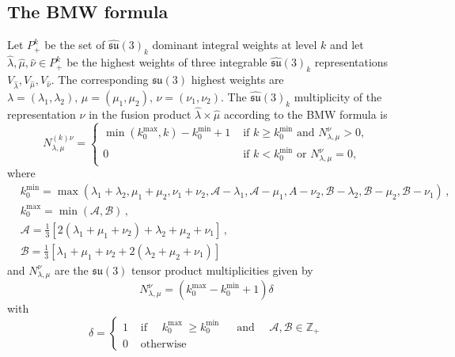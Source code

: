 \documentclass[a4paper,11pt]{article}
\theoremstyle{plain}
\theoremstyle{definition}
\newcommand{\aff}{\widehat{\mathfrak{su}}(3)_k}
\begin{document}
\subsection{The BMW formula }



Let $P^k_+$ be the set of $\aff$ dominant integral weights at level $k$ and let $\hat{\lambda},\hat{\mu},\hat{\nu}\in P^k_+$ be the highest weights  of three integrable $\widehat{\mathfrak{su}}(3)_k$ representations $V_{\hat{\lambda}},V_{\hat{\mu}},V_{\hat{\nu}}$. The corresponding  $\mathfrak{su}(3)$ highest weights are $\lambda=(\lambda_1,\lambda_2),\,\mu=(\mu_1,\mu_2),\,\nu=(\nu_1,\nu_2)$. The  $\aff$ multiplicity of the representation $\hat{\nu}$ in the fusion product $\hat{\lambda} \times \hat{\mu}$ according to the BMW formula  \cite{BMW}
is
\begin{equation}
   N_{\lambda, \mu}^{(k) \nu}= \begin{cases}\min \left(k_0^{\max }, k\right)-k_0^{\min }+1 & \text { if } k \geq k_0^{\min } \text { and } N_{\lambda, \mu}^\nu>0, \\ 0 & \text { if } k<k_0^{\min } \text { or } N_{\lambda, \mu}^\nu=0,\end{cases}
\end{equation}
where
\begin{align} \label{BMWkk}
& k_0^{\min }=\max \left(\lambda_1+\lambda_2, \mu_1+\mu_2, \nu_1+\nu_2,\mathcal{A}-\lambda_1,\mathcal{A}-\mu_1,A-\nu_2,\mathcal{B}-\lambda_2,\mathcal{B}-\mu_2,\mathcal{B}-\nu_1\right)\, ,  \nonumber \\
& k_0^{\max }=\min (\mathcal{A}, \mathcal{B}) \, , \nonumber \\
& \mathcal{A}=\frac{1}{3}\left[2\left(\lambda_1+\mu_1+\nu_2\right)+\lambda_2+\mu_2+\nu_1\right]\, , \nonumber \\
& \mathcal{B}=\frac{1}{3}\left[\lambda_1+\mu_1+\nu_2+2\left(\lambda_2+\mu_2+\nu_1\right)\right]
\end{align}
and $N_{\lambda,\mu}^{\nu}$ are the $\mathfrak{su}(3)$ tensor product multiplicities given by
\begin{equation}
    N_{\lambda,\mu}^{\nu}=\left(k_0^{\text{max}}-k_0^{\text{min}}+1\right)\delta
\end{equation}
with
\begin{equation}
    \delta= \begin{cases}1 & \text { if } \quad k_0^{\text {max }} \geq k_0^{\text {min }} \quad \text { and } \quad \mathcal{A}, \mathcal{B} \in \mathbb{Z}_{+} \\
0 & \text { otherwise }\end{cases}
\end{equation}
\end{document}
